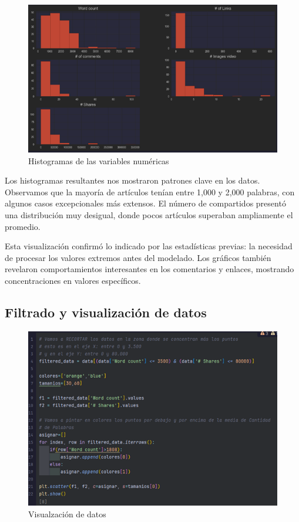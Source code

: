 \documentclass[12pt, a4paper]{article}
\begin{document}
\begin{figure}[H]
    \centering
    \includegraphics[width=1.0\textwidth]{Actividad-9/Imagen6.png}
    \caption{Histogramas de las variables numéricas}
\end{figure}

Los histogramas resultantes nos mostraron patrones clave en los datos. Observamos que la mayoría de artículos tenían entre 1,000 y 2,000 palabras, con algunos casos excepcionales más extensos. El número de compartidos presentó una distribución muy desigual, donde pocos artículos superaban ampliamente el promedio.

Esta visualización confirmó lo indicado por las estadísticas previas: la necesidad de procesar los valores extremos antes del modelado. Los gráficos también revelaron comportamientos interesantes en los comentarios y enlaces, mostrando concentraciones en valores específicos.

\subsection{Filtrado y visualización de datos}

\begin{figure}[H]
    \centering
    \includegraphics[width=1.0\textwidth]{Actividad-9/Imagen7.png}
    \caption{Visualzación de datos}
\end{figure}
\end{document}

